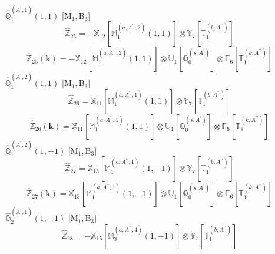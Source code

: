 \documentclass[fleqn,10pt,landscape]{article}
\begin{document}
\begin{itemize}
\begin{dmath*}
\end{dmath*}
\vspace{4mm}
\noindent {} $\,\,\,\hat{\mathbb{Q}}_{1}^{(A^{\prime},1)}(1,1)$ [M$_{1}$,\,B$_{3}$]
\begin{dmath*}
\hat{\mathbb{Z}}_{25}=- \mathbb{X}_{12}[\mathbb{M}_{1}^{(a,A^{\prime\prime},2)}(1,1)] \otimes\mathbb{Y}_{7}[\mathbb{T}_{1}^{(b,A^{\prime\prime})}]
\end{dmath*}
\begin{dmath*}
\hat{\mathbb{Z}}_{25}(\bm{k})=- \mathbb{X}_{12}[\mathbb{M}_{1}^{(a,A^{\prime\prime},2)}(1,1)] \otimes\mathbb{U}_{1}[\mathbb{Q}_{0}^{(s,A^{\prime})}] \otimes\mathbb{F}_{6}[\mathbb{T}_{1}^{(k,A^{\prime\prime})}]
\end{dmath*}
\vspace{4mm}
\noindent {} $\,\,\,\hat{\mathbb{Q}}_{1}^{(A^{\prime},2)}(1,1)$ [M$_{1}$,\,B$_{3}$]
\begin{dmath*}
\hat{\mathbb{Z}}_{26}=\mathbb{X}_{11}[\mathbb{M}_{1}^{(a,A^{\prime\prime},1)}(1,1)] \otimes\mathbb{Y}_{7}[\mathbb{T}_{1}^{(b,A^{\prime\prime})}]
\end{dmath*}
\begin{dmath*}
\hat{\mathbb{Z}}_{26}(\bm{k})=\mathbb{X}_{11}[\mathbb{M}_{1}^{(a,A^{\prime\prime},1)}(1,1)] \otimes\mathbb{U}_{1}[\mathbb{Q}_{0}^{(s,A^{\prime})}] \otimes\mathbb{F}_{6}[\mathbb{T}_{1}^{(k,A^{\prime\prime})}]
\end{dmath*}
\vspace{4mm}
\noindent {} $\,\,\,\hat{\mathbb{Q}}_{1}^{(A^{\prime},2)}(1,-1)$ [M$_{1}$,\,B$_{3}$]
\begin{dmath*}
\hat{\mathbb{Z}}_{27}=\mathbb{X}_{13}[\mathbb{M}_{1}^{(a,A^{\prime\prime},1)}(1,-1)] \otimes\mathbb{Y}_{7}[\mathbb{T}_{1}^{(b,A^{\prime\prime})}]
\end{dmath*}
\begin{dmath*}
\hat{\mathbb{Z}}_{27}(\bm{k})=\mathbb{X}_{13}[\mathbb{M}_{1}^{(a,A^{\prime\prime},1)}(1,-1)] \otimes\mathbb{U}_{1}[\mathbb{Q}_{0}^{(s,A^{\prime})}] \otimes\mathbb{F}_{6}[\mathbb{T}_{1}^{(k,A^{\prime\prime})}]
\end{dmath*}
\vspace{4mm}
\noindent {} $\,\,\,\hat{\mathbb{G}}_{2}^{(A^{\prime},1)}(1,-1)$ [M$_{1}$,\,B$_{3}$]
\begin{dmath*}
\hat{\mathbb{Z}}_{28}=- \mathbb{X}_{15}[\mathbb{M}_{3}^{(a,A^{\prime\prime},4)}(1,-1)] \otimes\mathbb{Y}_{7}[\mathbb{T}_{1}^{(b,A^{\prime\prime})}]
\end{dmath*}

\end{itemize}
\end{document}

